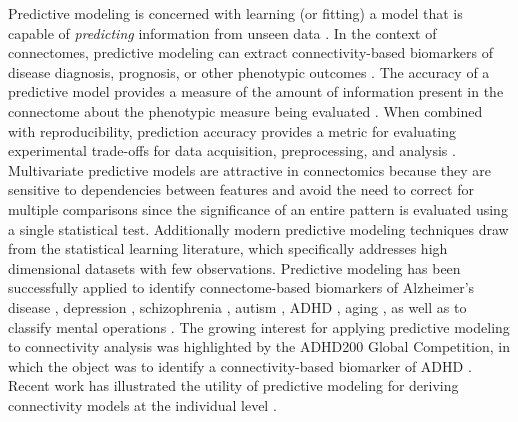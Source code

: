\documentclass[5p]{elsarticle}
\begin{document}



Predictive modeling is concerned with learning (or fitting) a model that is
capable of \emph{predicting} information from unseen data
\cite{pereira2009}.  In the context of connectomes, predictive modeling
can extract connectivity-based biomarkers of disease diagnosis,
prognosis, or other phenotypic outcomes \cite{craddock2009, dosenbach2010}. The
accuracy of a predictive model provides a measure of the amount of information
present in the connectome about the phenotypic measure being evaluated
\cite{kjems2002, kriegeskorte2006}.  When combined with reproducibility, prediction accuracy
provides a metric for evaluating experimental trade-offs for data acquisition,
preprocessing, and analysis \cite{strother2002, laconte2003}.  Multivariate
predictive models are attractive in connectomics because they are sensitive to dependencies
between features and avoid the need to correct for multiple comparisons since
the significance of an entire pattern is evaluated using a single statistical
test. 
Additionally modern predictive modeling techniques draw from the
statistical learning literature, which specifically addresses
 high dimensional datasets with few observations.
Predictive modeling has been
successfully applied to identify connectome-based biomarkers of Alzheimer's
disease \cite{stonnington2010}, depression \cite{craddock2009, zeng2012}, schizophrenia
\cite{cecchi2009, shen2010}, autism \cite{anderson2011}, ADHD \cite{zhu2008}, aging
\cite{dosenbach2010}, as well as to classify mental operations
\cite{richiardi2011,shirer2012}. The growing interest for applying
predictive modeling to connectivity analysis was highlighted by the ADHD200
Global Competition, in which the object was to identify a connectivity-based
biomarker of ADHD \cite{adhd2002012}. Recent work has illustrated the utility
of predictive modeling for deriving connectivity models at the individual level
\cite{chu2011}.
\end{document}
